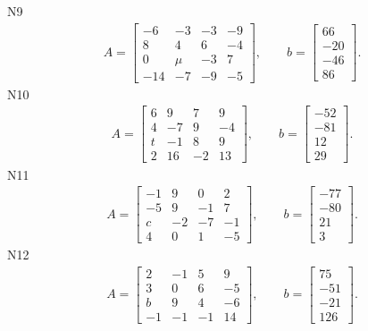 \documentclass[11pt]{report}
\begin{document}
N9
\begin{align*}
 A = \left[\begin{matrix}-6 & -3 & -3 & -9\\8 & 4 & 6 & -4\\0 & \mu & -3 & 7\\-14 & -7 & -9 & -5\end{matrix}\right],
\qquad b = \left[\begin{matrix}66\\-20\\-46\\86\end{matrix}\right]. 
 \end{align*}
N10
\begin{align*}
 A = \left[\begin{matrix}6 & 9 & 7 & 9\\4 & -7 & 9 & -4\\t & -1 & 8 & 9\\2 & 16 & -2 & 13\end{matrix}\right],
\qquad b = \left[\begin{matrix}-52\\-81\\12\\29\end{matrix}\right]. 
 \end{align*}
N11
\begin{align*}
 A = \left[\begin{matrix}-1 & 9 & 0 & 2\\-5 & 9 & -1 & 7\\c & -2 & -7 & -1\\4 & 0 & 1 & -5\end{matrix}\right],
\qquad b = \left[\begin{matrix}-77\\-80\\21\\3\end{matrix}\right]. 
 \end{align*}
N12
\begin{align*}
 A = \left[\begin{matrix}2 & -1 & 5 & 9\\3 & 0 & 6 & -5\\b & 9 & 4 & -6\\-1 & -1 & -1 & 14\end{matrix}\right],
\qquad b = \left[\begin{matrix}75\\-51\\-21\\126\end{matrix}\right]. 
 \end{align*}
\end{document}

